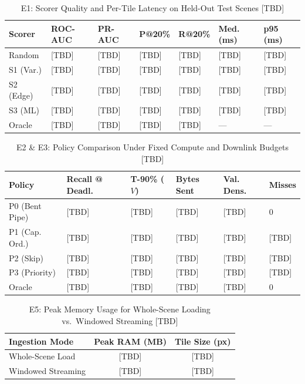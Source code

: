 \documentclass[conference]{IEEEtran}
\begin{document}
\begin{table}[t]
\centering
\caption{E1: Scorer Quality and Per-Tile Latency on Held-Out Test Scenes [TBD]}
\label{tab:e1}
\begin{tabularx}{\columnwidth}{lXXXXXX}
\toprule
\textbf{Scorer} & \textbf{ROC-AUC} & \textbf{PR-AUC} & \textbf{P@20\%} & \textbf{R@20\%} & \textbf{Med. (ms)} & \textbf{p95 (ms)} \\
\midrule
Random & [TBD] & [TBD] & [TBD] & [TBD] & [TBD] & [TBD] \\
S1 (Var.) & [TBD] & [TBD] & [TBD] & [TBD] & [TBD] & [TBD] \\
S2 (Edge) & [TBD] & [TBD] & [TBD] & [TBD] & [TBD] & [TBD] \\
S3 (ML) & [TBD] & [TBD] & [TBD] & [TBD] & [TBD] & [TBD] \\
Oracle & [TBD] & [TBD] & [TBD] & [TBD] & --- & --- \\
\bottomrule
\end{tabularx}
\end{table}

\begin{table}[t]
\centering
\caption{E2 \& E3: Policy Comparison Under Fixed Compute and Downlink Budgets [TBD]}
\label{tab:e2e3}
\begin{tabularx}{\columnwidth}{lXXXXX}
\toprule
\textbf{Policy} & \textbf{Recall @ Deadl.} & \textbf{T-90\% ($V$)} & \textbf{Bytes Sent} & \textbf{Val. Dens.} & \textbf{Misses} \\
\midrule
P0 (Bent Pipe) & [TBD] & [TBD] & [TBD] & [TBD] & 0 \\
P1 (Cap. Ord.) & [TBD] & [TBD] & [TBD] & [TBD] & [TBD] \\
P2 (Skip) & [TBD] & [TBD] & [TBD] & [TBD] & [TBD] \\
P3 (Priority) & [TBD] & [TBD] & [TBD] & [TBD] & [TBD] \\
Oracle & [TBD] & [TBD] & [TBD] & [TBD] & 0 \\
\bottomrule
\end{tabularx}
\end{table}

\begin{table}[t]
\centering
\caption{E5: Peak Memory Usage for Whole-Scene Loading vs.\ Windowed Streaming [TBD]}
\label{tab:e5}
\begin{tabular}{lcc}
\toprule
\textbf{Ingestion Mode} & \textbf{Peak RAM (MB)} & \textbf{Tile Size (px)} \\
\midrule
Whole-Scene Load & [TBD] & [TBD] \\
Windowed Streaming & [TBD] & [TBD] \\
\bottomrule
\end{tabular}
\end{table}
\end{document}
